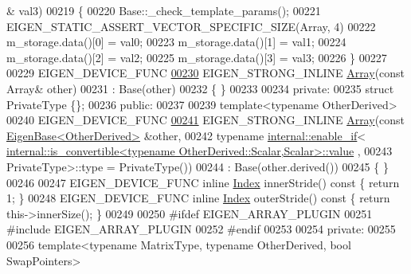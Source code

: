\begin{DoxyCode}
      & val3)
00219     \{
00220       Base::\_check\_template\_params();
00221       EIGEN\_STATIC\_ASSERT\_VECTOR\_SPECIFIC\_SIZE(Array, 4)
00222       m\_storage.data()[0] = val0;
00223       m\_storage.data()[1] = val1;
00224       m\_storage.data()[2] = val2;
00225       m\_storage.data()[3] = val3;
00226     \}
00227 
00229     EIGEN\_DEVICE\_FUNC
\hyperlink{group___core___module_a085268ca25404d706e7b8f4d33f15513}{00230}     EIGEN\_STRONG\_INLINE \hyperlink{group___core___module_a085268ca25404d706e7b8f4d33f15513}{Array}(\textcolor{keyword}{const} Array& other)
00231             : Base(other)
00232     \{ \}
00233 
00234   \textcolor{keyword}{private}:
00235     \textcolor{keyword}{struct }PrivateType \{\};
00236   \textcolor{keyword}{public}:
00237 
00239     \textcolor{keyword}{template}<\textcolor{keyword}{typename} OtherDerived>
00240     EIGEN\_DEVICE\_FUNC
\hyperlink{group___core___module_a7a08ebcc8bef6c9df21becd525792240}{00241}     EIGEN\_STRONG\_INLINE \hyperlink{group___core___module_a7a08ebcc8bef6c9df21becd525792240}{Array}(\textcolor{keyword}{const} \hyperlink{group___core___module_struct_eigen_1_1_eigen_base}{EigenBase<OtherDerived>} &other,
00242                               \textcolor{keyword}{typename} \hyperlink{struct_eigen_1_1internal_1_1enable__if}{internal::enable\_if}<
      \hyperlink{struct_eigen_1_1internal_1_1is__convertible}{internal::is\_convertible<typename OtherDerived::Scalar,Scalar>::value}
      ,
00243                                                            PrivateType>::type = PrivateType())
00244       : Base(other.derived())
00245     \{ \}
00246 
00247     EIGEN\_DEVICE\_FUNC \textcolor{keyword}{inline} \hyperlink{namespace_eigen_a62e77e0933482dafde8fe197d9a2cfde}{Index} innerStride()\textcolor{keyword}{ const }\{ \textcolor{keywordflow}{return} 1; \}
00248     EIGEN\_DEVICE\_FUNC \textcolor{keyword}{inline} \hyperlink{namespace_eigen_a62e77e0933482dafde8fe197d9a2cfde}{Index} outerStride()\textcolor{keyword}{ const }\{ \textcolor{keywordflow}{return} this->innerSize(); \}
00249 
00250 \textcolor{preprocessor}{    #ifdef EIGEN\_ARRAY\_PLUGIN}
00251 \textcolor{preprocessor}{    #include EIGEN\_ARRAY\_PLUGIN}
00252 \textcolor{preprocessor}{    #endif}
00253 
00254   \textcolor{keyword}{private}:
00255 
00256     \textcolor{keyword}{template}<\textcolor{keyword}{typename} MatrixType, \textcolor{keyword}{typename} OtherDerived, \textcolor{keywordtype}{bool} SwapPo\textcolor{keywordtype}{int}ers>

\end{DoxyCode}
